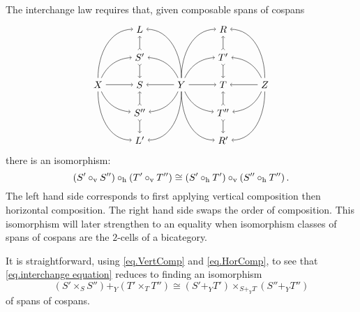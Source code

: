 \documentclass[11pt]{amsart}
\renewcommand{\t}[1]{\textup{#1}}
\theoremstyle{remark}
\theoremstyle{definition}
\begin{document}
The interchange law requires that, given composable spans of cospans
\begin{equation}
\label{diag.2cells interchanged}
\begin{tikzpicture}[baseline=(current  bounding  box.center)]
	\node (X) at (-4,0) {$X$};
	\node (Y) at (-1,0) {$Y$};
	\node (Z) at (2,0) {$Z$};
	\node (L) at (-2.5,2) {$L$};
	\node (S') at (-2.5,1) {$S'$};
	\node (S) at (-2.5,0) {$S$};
	\node (S'') at (-2.5,-1) {$S''$};
	\node (L') at (-2.5,-2) {$L'$};
	\node (R) at (0.5,2) {$R$};
	\node (T') at (0.5,1) {$T'$};
	\node (T) at (0.5,0) {$T$};
	\node (T'') at (0.5,-1) {$T''$};
	\node (R') at (0.5,-2) {$R'$};
	\draw [->] (X) edge[out=90,in=180] (L);
	\draw [->] (X) edge[bend left=30] (S');
	\draw [->] (X) edge (S);
	\draw [->] (X) edge[bend right=30] (S'');
	\draw [->] (X) edge[out=-90,in=180] (L');
	\draw [->] (Y) edge[out=90,in=0] (L);
	\draw [->] (Y) edge[bend right=30] (S');
	\draw [->] (Y) edge (S);
	\draw [->] (Y) edge[bend left=30] (S'');
	\draw [->] (Y) edge[out=-90,in=0] (L');
	\draw [->] (Y) edge[out=90,in=180] (R);
	\draw [->] (Y) edge[bend left=30] (T');
	\draw [->] (Y) edge (T);
	\draw [->] (Y) edge[bend right=30] (T'');
	\draw [->] (Y) edge[out=-90,in=180] (R');
	\draw [->] (Z) edge[out=90,in=0] (R);
	\draw [->] (Z) edge[bend right=30] (T');
	\draw [->] (Z) edge (T);
	\draw [->] (Z) edge[bend left=30] (T'');
	\draw [->] (Z) edge[out=-90,in=0] (R');
	\draw [>->] (S') edge (L);
	\draw [>->] (S') edge (S);
	\draw [>->] (S'') edge (S);
	\draw [>->] (S'') edge (L');
	\draw [>->] (T') edge (R);
	\draw [>->] (T') edge (T);
	\draw [>->] (T'') edge (T);
	\draw [>->] (T'') edge (R');
\end{tikzpicture}
\end{equation}
%
there is an isomorphism:
%
\begin{equation} 
\label{eq.interchange equation}
\left( S' \circ_\t{v} S'' \right) \circ_\t{h} 
\left( T' \circ_\t{v} T'' \right) \cong
\left( S' \circ_\t{h} T' \right) \circ_\t{v} 
\left( S'' \circ_\t{h} T'' \right).
\end{equation}
%
The left hand side corresponds to first applying vertical composition then horizontal composition.  The right hand side swaps the order of composition. This isomorphism will later strengthen to an equality when isomorphism classes of spans of cospans are the $2$-cells of a bicategory.

It is straightforward, using \eqref{eq.VertComp} and \eqref{eq.HorComp}, to see that \eqref{eq.interchange equation} reduces to finding an isomorphism
%
\begin{equation}
\label{eq.interchange simplified}
	(S' \times_S S'') +_Y (T' \times_T T'')
	\cong
	(S' +_Y T') \times_{S+_YT} (S'' +_Y T'')
\end{equation}
of spans of cospans.
\end{document}
